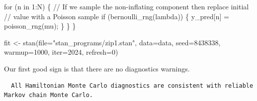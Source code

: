 \documentclass[
  letterpaper,
  DIV=11,
  numbers=noendperiod]{scrartcl}
\newenvironment{Shaded}{\begin{snugshade}}{\end{snugshade}}
\newcommand{\AttributeTok}[1]{\textcolor[rgb]{0.40,0.45,0.13}{#1}}
\newcommand{\CommentTok}[1]{\textcolor[rgb]{0.37,0.37,0.37}{#1}}
\newcommand{\ControlFlowTok}[1]{\textcolor[rgb]{0.00,0.23,0.31}{#1}}
\newcommand{\DecValTok}[1]{\textcolor[rgb]{0.68,0.00,0.00}{#1}}
\newcommand{\FunctionTok}[1]{\textcolor[rgb]{0.28,0.35,0.67}{#1}}
\newcommand{\NormalTok}[1]{\textcolor[rgb]{0.00,0.23,0.31}{#1}}
\newcommand{\OtherTok}[1]{\textcolor[rgb]{0.00,0.23,0.31}{#1}}
\newcommand{\SpecialCharTok}[1]{\textcolor[rgb]{0.37,0.37,0.37}{#1}}
\newcommand{\StringTok}[1]{\textcolor[rgb]{0.13,0.47,0.30}{#1}}
\begin{document}
\begin{codelisting}
\begin{Shaded}
\begin{Highlighting}[]
  \ControlFlowTok{for}\NormalTok{ (n }\ControlFlowTok{in} \DecValTok{1}\NormalTok{:N) \{}
    \CommentTok{// If we sample the non{-}inflating component then replace initial}
    \CommentTok{// value with a Poisson sample}
    \ControlFlowTok{if}\NormalTok{ (bernoulli\_rng(lambda)) \{}
\NormalTok{      y\_pred[n] = poisson\_rng(mu);}
\NormalTok{    \}}
\NormalTok{  \}}
\NormalTok{\}}
\end{Highlighting}
\end{Shaded}

\end{codelisting}

\begin{Shaded}
\begin{Highlighting}[]
\NormalTok{fit }\OtherTok{\textless{}{-}} \FunctionTok{stan}\NormalTok{(}\AttributeTok{file=}\StringTok{"stan\_programs/zip1.stan"}\NormalTok{,}
            \AttributeTok{data=}\NormalTok{data, }\AttributeTok{seed=}\DecValTok{8438338}\NormalTok{,}
            \AttributeTok{warmup=}\DecValTok{1000}\NormalTok{, }\AttributeTok{iter=}\DecValTok{2024}\NormalTok{, }\AttributeTok{refresh=}\DecValTok{0}\NormalTok{)}
\end{Highlighting}
\end{Shaded}

Our first good sign is that there are no diagnostics warnings.

\begin{Shaded}
\end{Shaded}

\begin{verbatim}
  All Hamiltonian Monte Carlo diagnostics are consistent with reliable
Markov chain Monte Carlo.
\end{verbatim}

\begin{Shaded}
\end{Shaded}
\end{document}
